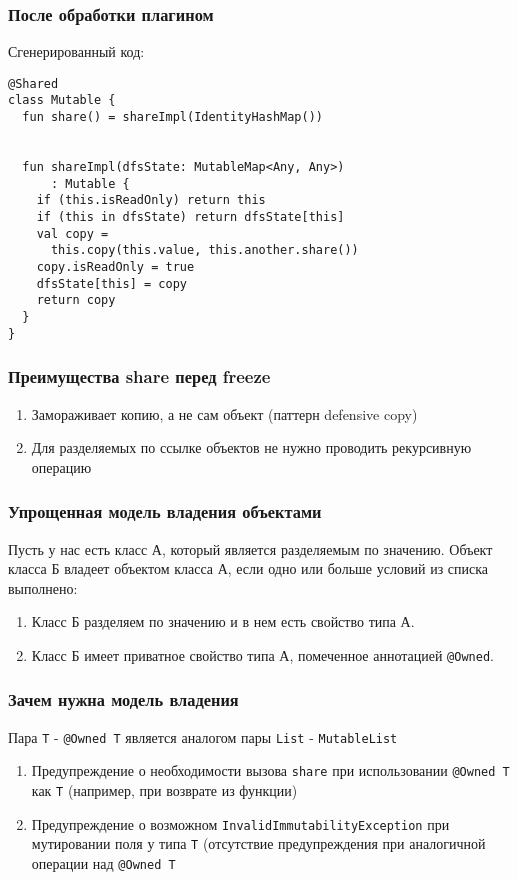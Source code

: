 \documentclass[14pt,xcolor={dvipsnames}]{beamer}
\begin{document}
\begin{frame}[fragile]
\frametitle{После обработки плагином}
Сгенерированный код:
\begin{lstlisting}[basicstyle=\fontsize{10}{1}\selectfont\ttfamily]
@Shared
class Mutable {
  fun share() = shareImpl(IdentityHashMap())
    
    
  fun shareImpl(dfsState: MutableMap<Any, Any>)
      : Mutable {
    if (this.isReadOnly) return this
	if (this in dfsState) return dfsState[this]
	val copy = 
	  this.copy(this.value, this.another.share())
	copy.isReadOnly = true
	dfsState[this] = copy
	return copy
  }
}
\end{lstlisting}
\end{frame}


\begin{frame}
\frametitle{Преимущества share перед freeze}
\begin{enumerate}
	\item Замораживает копию, а не сам объект (паттерн defensive copy)
	\item Для разделяемых по ссылке объектов не нужно проводить рекурсивную операцию
\end{enumerate}	
\end{frame}

\begin{frame}
\frametitle{Упрощенная модель владения объектами}
Пусть у нас есть класс А, который является разделяемым по значению.
Объект класса Б владеет объектом класса А, если одно или больше условий из списка выполнено:

\begin{enumerate}
	\item Класс Б разделяем по значению и в нем есть свойство типа А.
	\item Класс Б имеет приватное свойство типа А, помеченное аннотацией \texttt{@Owned}.
\end{enumerate}
\end{frame}

\begin{frame}
\frametitle{Зачем нужна модель владения}
Пара \texttt{T} - \texttt{@Owned T} является аналогом пары \texttt{List} - \texttt{MutableList}

\begin{enumerate}
	\item Предупреждение о необходимости вызова \texttt{share} при использовании \texttt{@Owned T} как \texttt{T} (например, при возврате из функции)
	\item Предупреждение о возможном \texttt{InvalidImmutabilityException} при мутировании поля у типа \texttt{T} (отсутствие предупреждения при аналогичной операции над \texttt{@Owned T}
\end{enumerate}
\end{frame}
\end{document}
